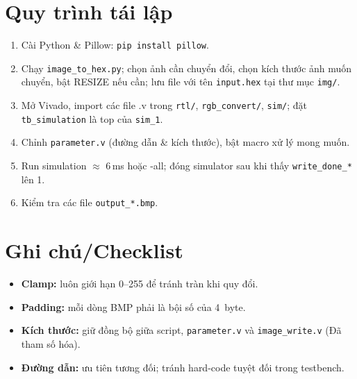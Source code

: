\section{Quy trình tái lập}
\begin{enumerate}
  \item Cài Python \& Pillow: \texttt{pip install pillow}.
  \item Chạy \texttt{image\_to\_hex.py}; chọn ảnh cần chuyển đổi, chọn kích thước ảnh muốn chuyển, bật RESIZE nếu cần; lưu file với tên \texttt{input.hex} tại thư mục \texttt{img/}.
  \item Mở Vivado, import các file .v trong \texttt{rtl/}, \texttt{rgb_convert/}, \texttt{sim/}; đặt \texttt{tb\_simulation} là top của \texttt{sim\_1}.
  \item Chỉnh \texttt{parameter.v} (đường dẫn \& kích thước), bật macro xử lý mong muốn.
  \item Run simulation $\approx$ 6\,ms hoặc -all; đóng simulator sau khi thấy \texttt{write\_done\_*} lên 1.
  \item Kiểm tra các file \texttt{output\_*.bmp}.
\end{enumerate}

\section{Ghi chú/Checklist}
\begin{itemize}
  \item \textbf{Clamp:} luôn giới hạn 0--255 để tránh tràn khi quy đổi.
  \item \textbf{Padding:} mỗi dòng BMP phải là bội số của 4~byte.
  \item \textbf{Kích thước:} giữ đồng bộ giữa script, \texttt{parameter.v} và \texttt{image\_write.v} (Đã tham số hóa).
  \item \textbf{Đường dẫn:} ưu tiên tương đối; tránh hard-code tuyệt đối trong testbench.
\end{itemize}


\nocite{*}  %


